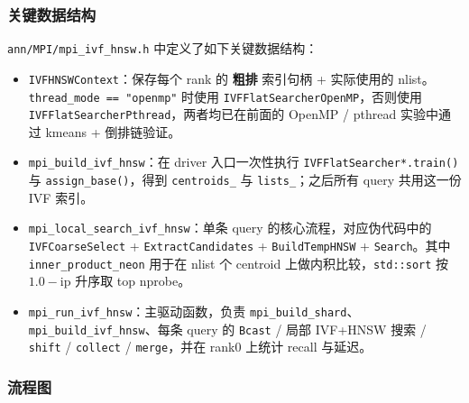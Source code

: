 \documentclass[a4paper]{article}
\begin{document}
\subsubsection{关键数据结构}

\texttt{ann/MPI/mpi\_ivf\_hnsw.h} 中定义了如下关键数据结构：

\begin{itemize}
    \item \texttt{IVFHNSWContext}：保存每个 rank 的 \textbf{粗排} 索引句柄 + 实际使用的 nlist。\texttt{thread\_mode == "openmp"} 时使用 \texttt{IVFFlatSearcherOpenMP}，否则使用 \texttt{IVFFlatSearcherPthread}，两者均已在前面的 OpenMP / pthread 实验中通过 kmeans + 倒排链验证。
    \item \texttt{mpi\_build\_ivf\_hnsw}：在 driver 入口一次性执行 \texttt{IVFFlatSearcher*.train()} 与 \texttt{assign\_base()}，得到 \texttt{centroids\_} 与 \texttt{lists\_}；之后所有 query 共用这一份 IVF 索引。
    \item \texttt{mpi\_local\_search\_ivf\_hnsw}：单条 query 的核心流程，对应伪代码中的 \texttt{IVFCoarseSelect} + \texttt{ExtractCandidates} + \texttt{BuildTempHNSW} + \texttt{Search}。其中 \texttt{inner\_product\_neon} 用于在 nlist 个 centroid 上做内积比较，\texttt{std::sort} 按 $1.0 - \text{ip}$ 升序取 top nprobe。
    \item \texttt{mpi\_run\_ivf\_hnsw}：主驱动函数，负责 \texttt{mpi\_build\_shard}、\texttt{mpi\_build\_ivf\_hnsw}、每条 query 的 \texttt{Bcast} / 局部 IVF+HNSW 搜索 / \texttt{shift} / \texttt{collect} / \texttt{merge}，并在 rank0 上统计 recall 与延迟。
\end{itemize}

\subsubsection{流程图}
\end{document}
